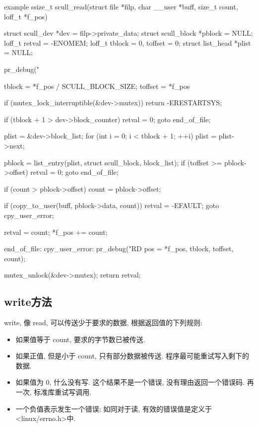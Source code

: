 \documentclass[lang=cn,newtx,10pt,scheme=chinese]{elegantbook}
\begin{document}
\begin{mycode}{example}
ssize_t scull_read(struct file *filp, char __user *buff, size_t count,
                   loff_t *f_pos)
{
    struct scull_dev *dev = filp->private_data;
    struct scull_block *pblock = NULL;
    loff_t retval = -ENOMEM;
    loff_t tblock = 0, toffset = 0;
    struct list_head *plist = NULL;

    pr_debug("%

    tblock = *f_pos / SCULL_BLOCK_SIZE;
    toffset = *f_pos %

    if (mutex_lock_interruptible(&dev->mutex))
        return -ERESTARTSYS;

    if (tblock + 1 > dev->block_counter)
    {
        retval = 0;
        goto end_of_file;
    }

    plist = &dev->block_list;
    for (int i = 0; i < tblock + 1; ++i)
    {
        plist = plist->next;
    }

    pblock = list_entry(plist, struct scull_block, block_list);
    if (toffset >= pblock->offset)
    {
        retval = 0;
        goto end_of_file;
    }

    if (count > pblock->offset)
        count = pblock->offset;

    if (copy_to_user(buff, pblock->data, count))
    {
        retval = -EFAULT;
        goto cpy_user_error;
    }

    retval = count;
    *f_pos += count;

end_of_file:
cpy_user_error:
    pr_debug("RD pos = %
             *f_pos, tblock, toffset, count);

    mutex_unlock(&dev->mutex);
    return retval;
}
\end{mycode}

\subsection{write方法}

write, 像 read, 可以传送少于要求的数据, 根据返回值的下列规则:

\begin{itemize}
\item 如果值等于 count, 要求的字节数已被传送.
\item 如果正值, 但是小于 count, 只有部分数据被传送. 程序最可能重试写入剩下的数据.
\item 如果值为 0, 什么没有写. 这个结果不是一个错误, 没有理由返回一个错误码. 再一次, 标准库重试写调用.
\item 一个负值表示发生一个错误; 如同对于读, 有效的错误值是定义于<linux/errno.h>中.
\end{itemize}
\end{document}

